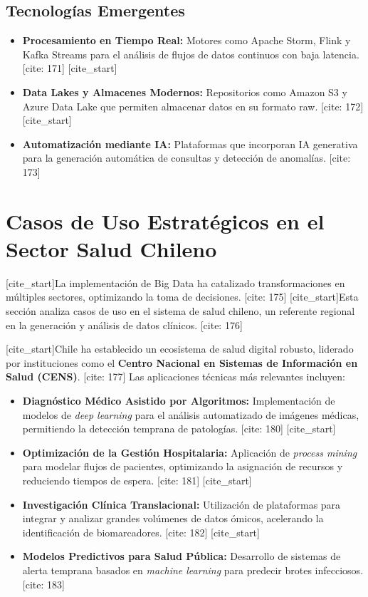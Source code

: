 \documentclass[12pt, a4paper]{article}
\begin{document}
\subsection{Tecnologías Emergentes}
\begin{itemize}
    [cite_start]\item \textbf{Procesamiento en Tiempo Real:} Motores como Apache Storm, Flink y Kafka Streams para el análisis de flujos de datos continuos con baja latencia. [cite: 171]
    [cite_start]\item \textbf{Data Lakes y Almacenes Modernos:} Repositorios como Amazon S3 y Azure Data Lake que permiten almacenar datos en su formato raw. [cite: 172]
    [cite_start]\item \textbf{Automatización mediante IA:} Plataformas que incorporan IA generativa para la generación automática de consultas y detección de anomalías. [cite: 173]
\end{itemize}

\section{Casos de Uso Estratégicos en el Sector Salud Chileno}
[cite_start]La implementación de Big Data ha catalizado transformaciones en múltiples sectores, optimizando la toma de decisiones. [cite: 175] [cite_start]Esta sección analiza casos de uso en el sistema de salud chileno, un referente regional en la generación y análisis de datos clínicos. [cite: 176]

[cite_start]Chile ha establecido un ecosistema de salud digital robusto, liderado por instituciones como el \textbf{Centro Nacional en Sistemas de Información en Salud (CENS)}. [cite: 177] Las aplicaciones técnicas más relevantes incluyen:
\begin{itemize}
    [cite_start]\item \textbf{Diagnóstico Médico Asistido por Algoritmos:} Implementación de modelos de \textit{deep learning} para el análisis automatizado de imágenes médicas, permitiendo la detección temprana de patologías. [cite: 180]
    [cite_start]\item \textbf{Optimización de la Gestión Hospitalaria:} Aplicación de \textit{process mining} para modelar flujos de pacientes, optimizando la asignación de recursos y reduciendo tiempos de espera. [cite: 181]
    [cite_start]\item \textbf{Investigación Clínica Translacional:} Utilización de plataformas para integrar y analizar grandes volúmenes de datos ómicos, acelerando la identificación de biomarcadores. [cite: 182]
    [cite_start]\item \textbf{Modelos Predictivos para Salud Pública:} Desarrollo de sistemas de alerta temprana basados en \textit{machine learning} para predecir brotes infecciosos. [cite: 183]
\end{itemize}
\end{document}
